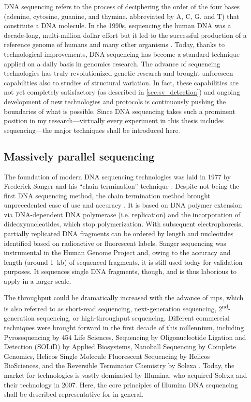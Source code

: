 DNA sequencing refers to the process of deciphering the order of the four bases
(adenine, cytosine, guanine, and thymine, abbreviated by A, C, G, and T) that
constitute a DNA molecule. In the 1990s, sequencing the human DNA was a
decade-long, multi-million dollar effort but it led to the successful production
of a reference genome of humans and many other organisms
\citep{Lander2001,Venter2001}. Today, thanks to technological improvements,
DNA sequencing has become a standard technique applied on a daily basis in
genomics research. The advance of sequencing technologies has truly
revolutionized genetic research and brought unforeseen capabilities also to
studies of structural variation. In fact, these capabilities are not yet completely satisfactory
(as described in \cref{sec:sv_detection}) and ongoing
development of new technologies and protocols is continuously pushing the
boundaries of what is possible. Since DNA sequencing takes such a prominent
position in my research---virtually every experiment in this thesis includes
sequencing---the major techniques shall be introduced here.




\subsection{Massively parallel sequencing}
\label{sec:mps}

The foundation of modern DNA sequencing technologies was laid in 1977 by Frederick Sanger
and his ``chain termination'' technique \citep{Sanger1977}. Despite not being
the first DNA sequencing method, the chain termination method brought
unprecedented ease of use and accuracy \citep{Heather2016}. It is based on DNA
polymer extension via DNA-dependent DNA polymerase (i.e. replication) and the
incorporation of dideoxynucleotides, which stop polymerization. With subsequent
electrophoresis, partially replicated DNA fragments can be ordered by length and
nucleotides identified based on radioactive or fluorescent labels.
Sanger sequencing was instrumental in the Human Genome Project and, owing to the
accuracy and length (around 1~kb) of sequenced fragments, it is still used
today for validation purposes. It sequences single DNA fragments, though, and
is thus laborious to apply in a larger scale.

The throughput could be dramatically increased with the advance of \acf{mps},
which is also referred to as short-read sequencing, next-generation sequencing,
2\textsuperscript{nd}-generation sequencing, or high-throughput sequencing.
Different commercial techniques were brought forward in the first decade of this
millennium, including Pyrosequencing by 454 Life Sciences, Sequencing by
Oligonucleotide Ligation and Detection (SOLiD) by Applied Biosystems,
Nanoball Sequencing by Complete Genomics, Helicos Single Molecule Fluorescent
Sequencing by Helicos BioSciences, and the Reversible Terminator Chemistry by
Solexa \citep{wikiDNAseq2018}. Today, the market for \mps technologies is vastly
dominated by Illumina, who acquired Solexa and their technology in 2007. Here,
the core principles of Illumina DNA sequencing shall be described representative
for \mps in general.


